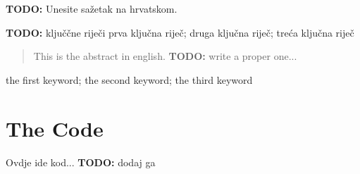 \documentclass[zavrsnirad]{fer}
\begin{document}






\begin{sazetak}
  \textbf{TODO:} Unesite sažetak na hrvatskom.
  \blindtext
\end{sazetak}

\begin{kljucnerijeci}
  \textbf{TODO:} ključčne riječi
  prva ključna riječ; druga ključna riječ; treća ključna riječ
\end{kljucnerijeci}


\begin{abstract}
  This is the abstract in english. \textbf{TODO:} write a proper one...
  \blindtext
\end{abstract}

\begin{keywords}
  the first keyword; the second keyword; the third keyword
\end{keywords}



\backmatter

\chapter{The Code}

Ovdje ide kod... \textbf{TODO:} dodaj ga
\end{document}
